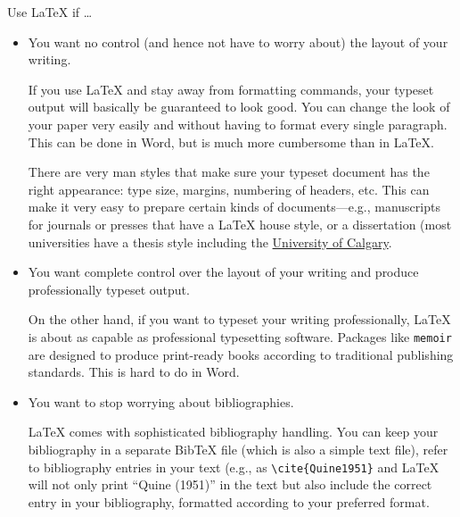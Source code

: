 \begin{frame}[fragile]{Use \LaTeX{} if \dots}

\begin{itemize}
\item You want no control (and hence not have to worry about) the
  layout of your writing.

\begin{articleonly}
If you use \LaTeX{} and stay away from formatting commands, your
typeset output will basically be guaranteed to look good.  You can
change the look of your paper very easily and without having to format
every single paragraph.  This can be done in Word, but is much more
cumbersome than in \LaTeX.

There are very man styles that make sure your typeset document has the
right appearance: type size, margins, numbering of headers, etc. This
can make it very easy to prepare certain kinds of documents---e.g.,
manuscripts for journals or presses that have a \LaTeX{} house style,
or a dissertation (most universities have a thesis style including the
\href{http://grad.ucalgary.ca/current/thesis/latex-template}{University
  of Calgary}.
\end{articleonly}

\item You want complete control over the layout of your writing and
  produce professionally typeset output.

\begin{articleonly}
On the other hand, if you want to typeset your writing professionally,
\LaTeX{} is about as capable as professional typesetting
software. Packages like \texttt{memoir} are designed to produce
print-ready books according to traditional publishing standards. This
is hard to do in Word.
\end{articleonly}

\item You want to stop worrying about bibliographies.

\begin{articleonly}
\LaTeX{} comes with sophisticated bibliography handling. You can keep
your bibliography in a separate Bib\TeX{} file (which is also a simple
text file), refer to bibliography entries in your text (e.g., as
\verb+\cite{Quine1951}+ and \LaTeX{} will not only print ``Quine
(1951)'' in the text but also include the correct entry in your
bibliography, formatted according to your preferred format.
\end{articleonly}


\end{itemize}
\end{frame}
